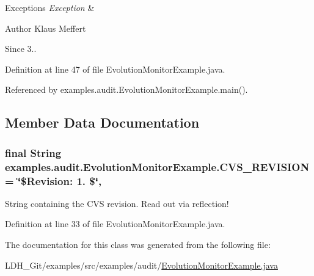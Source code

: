 \begin{DoxyExceptions}{Exceptions}
{\em Exception} & \\
\hline
\end{DoxyExceptions}
\begin{DoxyAuthor}{Author}
Klaus Meffert 
\end{DoxyAuthor}
\begin{DoxySince}{Since}
3.. 
\end{DoxySince}


Definition at line 47 of file Evolution\-Monitor\-Example.\-java.



Referenced by examples.\-audit.\-Evolution\-Monitor\-Example.\-main().



\subsection{Member Data Documentation}
\hypertarget{classexamples_1_1audit_1_1_evolution_monitor_example_ac4ed804deb85daa80d3952f41a83ab42}{
\subsubsection[{C\-V\-S\-\_\-\-R\-E\-V\-I\-S\-I\-O\-N}]{\setlength{\rightskip}{0pt plus 5cm}final String examples.\-audit.\-Evolution\-Monitor\-Example.\-C\-V\-S\-\_\-\-R\-E\-V\-I\-S\-I\-O\-N = \char`\"{}\$Revision\-: 1. \$\char`\"{}\hspace{0.3cm}{\ttfamily [static]}, {\ttfamily [private]}}}\label{classexamples_1_1audit_1_1_evolution_monitor_example_ac4ed804deb85daa80d3952f41a83ab42}
String containing the C\-V\-S revision. Read out via reflection! 

Definition at line 33 of file Evolution\-Monitor\-Example.\-java.



The documentation for this class was generated from the following file\-:\begin{DoxyCompactItemize}
\item 
L\-D\-H\-\_\-\-Git/examples/src/examples/audit/\hyperlink{_evolution_monitor_example_8java}{Evolution\-Monitor\-Example.\-java}\end{DoxyCompactItemize}
